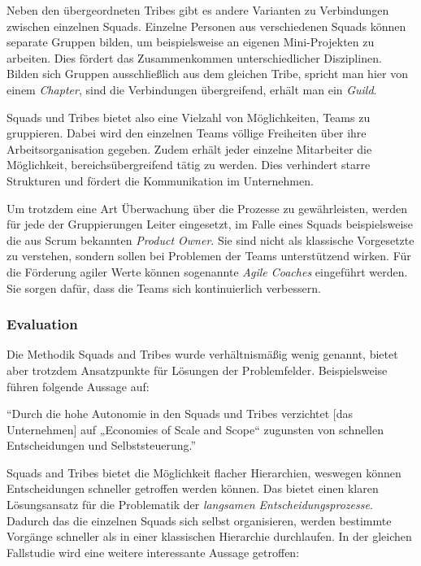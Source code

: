 Neben den übergeordneten Tribes gibt es andere Varianten zu Verbindungen zwischen einzelnen Squads. Einzelne Personen aus verschiedenen Squads können separate Gruppen bilden, um beispielsweise an eigenen Mini-Projekten zu arbeiten. Dies fördert das Zusammenkommen unterschiedlicher Disziplinen. Bilden sich Gruppen ausschließlich aus dem gleichen Tribe, spricht man hier von einem \textit{Chapter}, sind die Verbindungen übergreifend, erhält man ein \textit{Guild}. \cite[S. 9f.]{kniberg_scaling_2012}

Squads und Tribes bietet also eine Vielzahl von Möglichkeiten, Teams zu gruppieren. Dabei wird den einzelnen Teams völlige Freiheiten über ihre Arbeitsorganisation gegeben. Zudem erhält jeder einzelne Mitarbeiter die Möglichkeit, bereichsübergreifend tätig zu werden. Dies verhindert starre Strukturen und fördert die Kommunikation im Unternehmen. 

Um trotzdem eine Art Überwachung über die Prozesse zu gewährleisten, werden für jede der Gruppierungen Leiter eingesetzt, im Falle eines Squads beispielsweise die aus Scrum bekannten \textit{Product Owner}. Sie sind nicht als klassische Vorgesetzte zu verstehen, sondern sollen bei Problemen der Teams unterstützend wirken. Für die Förderung agiler Werte können sogenannte \textit{Agile  Coaches} eingeführt werden. Sie sorgen dafür, dass die Teams sich kontinuierlich verbessern. \cite[S. 4]{kniberg_scaling_2012}

\subsubsection{Evaluation}

Die Methodik Squads and Tribes wurde verhältnismäßig wenig  genannt, bietet aber trotzdem Ansatzpunkte für Lösungen der Problemfelder. Beispielsweise führen  folgende Aussage auf:

\begin{center}
	``Durch die hohe Autonomie in den Squads und Tribes verzichtet [das Unternehmen] auf „Economies of Scale and Scope“ zugunsten von schnellen Entscheidungen und Selbststeuerung.'' \cite[S. 98]{heinemann_digitale_2016}
\end{center}

Squads and Tribes bietet die Möglichkeit flacher Hierarchien, weswegen können Entscheidungen schneller getroffen werden können. Das bietet einen klaren Lösungsansatz für die Problematik der \textit{langsamen Entscheidungsprozesse}. Dadurch das die einzelnen Squads sich selbst  organisieren, werden bestimmte Vorgänge schneller als in einer klassischen Hierarchie durchlaufen. In der gleichen Fallstudie wird eine weitere interessante  Aussage getroffen:

